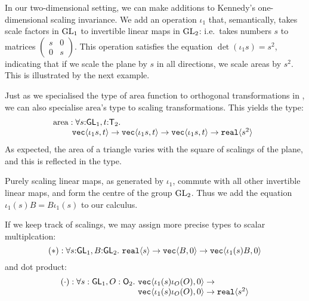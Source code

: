 In our two-dimensional setting, we can make additions to Kennedy's
one-dimensional scaling invariance. We add an operation $\iota_1$
that, semantically, takes scale factors in $\mathrm{GL}_1$ to invertible
linear maps in $\mathrm{GL}_2$: i.e.~takes numbers $s$ to matrices $\left(
  \begin{smallmatrix}s & 0 \\ 0 & s\end{smallmatrix}\right)$.  This
operation satisfies the equation $\det (\iota_1 s) = s^2$, indicating
that if we scale the plane by $s$ in all directions, we scale areas by
$s^2$. This is illustrated by the next example.

\begin{example}\label{ex:area-of-triangle-2}
  Just as we specialised the type of $\mathrm{area}$ function to
  orthogonal transformations in , we can
  also specialise $\mathrm{area}$'s type to scaling
  transformations. This yields the type:
  \begin{displaymath}
    \begin{array}{@{}l}
      \mathrm{area} : \forall s\mathord:\SynGL_1, t\mathord:\SynTransl_2.\ \\
      \hspace{0.8cm} \tyPrim{vec}{\iota_1s, t} \to \tyPrim{vec}{\iota_1s, t} \to \tyPrim{vec}{\iota_1s, t} \to \tyPrim{real}{s^2}
    \end{array}
  \end{displaymath}
  As expected, the area of a triangle varies with the square of
  scalings of the plane, and this is reflected in the type.
\end{example}

Purely scaling linear maps, as generated by $\iota_1$, commute with
all other invertible linear maps, and form the centre of the group
$\mathrm{GL}_2$. Thus we add the equation $\iota_1(s)B = B\iota_1(s)$ to our
calculus.

If we keep track of scalings, we may assign more precise types to
scalar multiplcation:
\begin{displaymath}
  (*) : \forall s \mathord: \mathsf{GL}_1, B \mathord: \mathsf{GL}_2.\ \texttt{real}\langle s \rangle \to \texttt{vec}\langle B,0 \rangle \to \texttt{vec}\langle \iota_1(s)B,0 \rangle
\end{displaymath}
and dot product:
\begin{displaymath}
  \begin{array}{l@{}l}
    (\cdot) : \forall s : \SynGL_1, O : \SynOrth_2.\ & \tyPrim{vec}{\iota_1(s)\iota_O(O),0} \to\\
    &\tyPrim{vec}{\iota_1(s)\iota_O(O),0} \to \tyPrim{real}{s^2}
  \end{array}
\end{displaymath}

